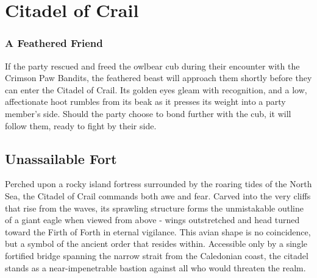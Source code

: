 \chapter*{Citadel of Crail}


\subsection*{A Feathered Friend}
{\entryfont If the party rescued and freed the owlbear cub during their encounter with the Crimson Paw Bandits, the feathered beast will approach them shortly before they can enter the Citadel of Crail. Its golden eyes gleam with recognition, and a low, affectionate hoot rumbles from its beak as it presses its weight into a party member's side. Should the party choose to bond further with the cub, it will follow them, ready to fight by their side.}

\section*{Unassailable Fort}
{\entryfont Perched upon a rocky island fortress surrounded by the roaring tides of the North Sea, the Citadel of Crail commands both awe and fear. Carved into the very cliffs that rise from the waves, its sprawling structure forms the unmistakable outline of a giant eagle when viewed from above - wings outstretched and head turned toward the Firth of Forth in eternal vigilance. This avian shape is no coincidence, but a symbol of the ancient order that resides within. Accessible only by a single fortified bridge spanning the narrow strait from the Caledonian coast, the citadel stands as a near-impenetrable bastion against all who would threaten the realm.}
